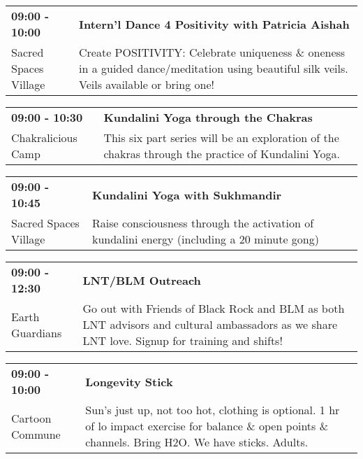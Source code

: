 \begin{tabular}{ p{1in} p{2.2in} }
    \textbf{09:00 - 10:00} & \textbf{Intern'l Dance 4 Positivity with Patricia Aishah} \\
    Sacred Spaces Village \newline  & Create POSITIVITY:  Celebrate uniqueness \& oneness in a guided dance/meditation using beautiful silk veils. Veils available or bring one! \\
    \hline 
\end{tabular}
    
\begin{tabular}{ p{1in} p{2.2in} }
    \textbf{09:00 - 10:30} & \textbf{Kundalini Yoga through the Chakras} \\
    Chakralicious Camp \newline  & This six part series will be an exploration of the chakras through the practice of Kundalini Yoga. \\
    \hline 
\end{tabular}
    
\begin{tabular}{ p{1in} p{2.2in} }
    \textbf{09:00 - 10:45} & \textbf{Kundalini Yoga with Sukhmandir} \\
    Sacred Spaces Village \newline  & Raise consciousness through the activation of kundalini energy (including a 20 minute gong) \\
    \hline 
\end{tabular}
    
\begin{tabular}{ p{1in} p{2.2in} }
    \textbf{09:00 - 12:30} & \textbf{LNT/BLM Outreach } \\
    Earth Guardians \newline  & Go out with Friends of Black Rock and BLM as both LNT advisors and cultural ambassadors as we share LNT love. Signup for training and shifts! \\
    \hline 
\end{tabular}
    
\begin{tabular}{ p{1in} p{2.2in} }
    \textbf{09:00 - 10:00} & \textbf{Longevity Stick} \\
    Cartoon Commune \newline  & Sun's just up, not too hot, clothing is optional. 1 hr of lo impact exercise for balance \& open points \& channels. Bring H2O. We have sticks. Adults. \\
    \hline 
\end{tabular}
    
